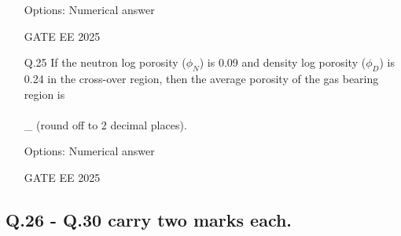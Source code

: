\documentclass[journal]{IEEEtran}
\begin{document}
\begin{enumerate}[leftmargin=*,series=q]
Options: Numerical answer

GATE EE 2025
 \vspace{0.5cm} 
\item[Q.25] If the neutron log porosity ($\phi_N$) is 0.09 and density log porosity ($\phi_D$) is 0.24 in the cross-over region, then the average porosity of the gas bearing region is \\\\\_ (round off to 2 decimal places).

Options: Numerical answer

GATE EE 2025
\end{enumerate}
 \vspace{0.5cm} 
\subsection*{Q.26 - Q.30 carry two marks each.}
\end{document}
